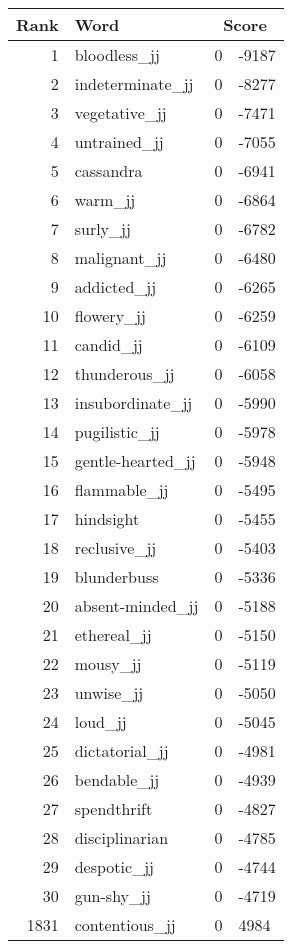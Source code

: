 \begin{longtable}[!htbp]{| rlr@{.}l |}
    \hline
    \textbf{Rank} & \textbf{Word} & \multicolumn{2}{c|}{\textbf{Score}} \\
    \hline
    \endhead
    1 & bloodless\_jj & 0 & -9187 \\
    2 & indeterminate\_jj & 0 & -8277 \\
    3 & vegetative\_jj & 0 & -7471 \\
    4 & untrained\_jj & 0 & -7055 \\
    5 & cassandra & 0 & -6941 \\
    6 & warm\_jj & 0 & -6864 \\
    7 & surly\_jj & 0 & -6782 \\
    8 & malignant\_jj & 0 & -6480 \\
    9 & addicted\_jj & 0 & -6265 \\
    10 & flowery\_jj & 0 & -6259 \\
    11 & candid\_jj & 0 & -6109 \\
    12 & thunderous\_jj & 0 & -6058 \\
    13 & insubordinate\_jj & 0 & -5990 \\
    14 & pugilistic\_jj & 0 & -5978 \\
    15 & gentle-hearted\_jj & 0 & -5948 \\
    16 & flammable\_jj & 0 & -5495 \\
    17 & hindsight & 0 & -5455 \\
    18 & reclusive\_jj & 0 & -5403 \\
    19 & blunderbuss & 0 & -5336 \\
    20 & absent-minded\_jj & 0 & -5188 \\
    21 & ethereal\_jj & 0 & -5150 \\
    22 & mousy\_jj & 0 & -5119 \\
    23 & unwise\_jj & 0 & -5050 \\
    24 & loud\_jj & 0 & -5045 \\
    25 & dictatorial\_jj & 0 & -4981 \\
    26 & bendable\_jj & 0 & -4939 \\
    27 & spendthrift & 0 & -4827 \\
    28 & disciplinarian & 0 & -4785 \\
    29 & despotic\_jj & 0 & -4744 \\
    30 & gun-shy\_jj & 0 & -4719 \\
    1831 & contentious\_jj & 0 & 4984 \\

\end{longtable}
